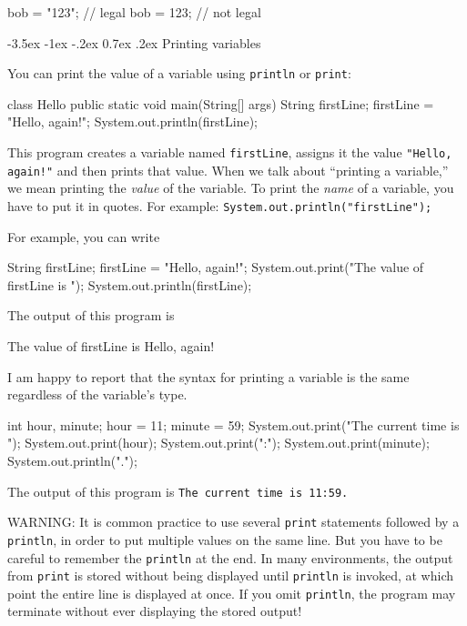 \documentclass{book}
\makeatletter
\renewcommand{\section}{\@startsection 
    {section} {1} {0mm}%
    {-3.5ex \@plus -1ex \@minus -.2ex}%
    {0.7ex \@plus.2ex}%
    {\normalfont\Large\bfseries}}
\makeatother
\begin{document}
\begin{verbatimtab}
    bob = "123";     // legal
    bob = 123;       // not legal
\end{verbatimtab}


\section{Printing variables}
\label{printing}

You can print the value of a variable using {\tt println} or
{\tt print}:

\begin{verbatimtab}
class Hello {
  public static void main(String[] args) {
    String firstLine;
    firstLine = "Hello, again!";
    System.out.println(firstLine);
  }
}
\end{verbatimtab}
%
This program creates a variable named {\tt firstLine}, assigns
it the value {\tt "Hello, again!"} and then prints that value.
When we talk about ``printing a variable,'' we mean printing
the {\em value} of the variable.  To print the {\em name} of
a variable, you have to put it in quotes.
For example: {\tt System.out.println("firstLine");}

For example, you can write

\begin{verbatimtab}
    String firstLine;
    firstLine = "Hello, again!";
    System.out.print("The value of firstLine is ");
    System.out.println(firstLine);
\end{verbatimtab}
%
The output of this program is

\begin{verbatimtab}
The value of firstLine is Hello, again!
\end{verbatimtab}
%
I am happy to report that the syntax for printing a variable
is the same regardless of the variable's type.

\begin{verbatimtab}
    int hour, minute;
    hour = 11;
    minute = 59;
    System.out.print("The current time is ");
    System.out.print(hour);
    System.out.print(":");
    System.out.print(minute);
    System.out.println(".");
\end{verbatimtab}
%
The output of this program is {\tt The current time is 11:59.}

WARNING: It is common practice to use several {\tt print} statements
followed by a {\tt println}, in order to put multiple values
on the same line.  But you have to be careful to remember
the {\tt println} at the end.  In many environments, the
output from {\tt print} is stored without being displayed until
{\tt println} is invoked, at which point the entire
line is displayed at once.  If you omit {\tt println}, the
program may terminate without ever displaying the stored output!
\end{document}
